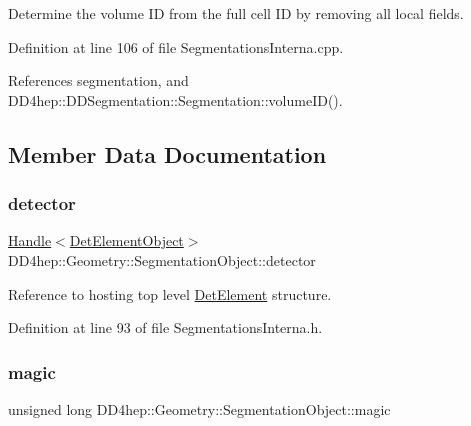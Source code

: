 Determine the volume ID from the full cell ID by removing all local fields. 



Definition at line 106 of file Segmentations\+Interna.\+cpp.



References segmentation, and D\+D4hep\+::\+D\+D\+Segmentation\+::\+Segmentation\+::volume\+I\+D().



\subsection{Member Data Documentation}
\hypertarget{class_d_d4hep_1_1_geometry_1_1_segmentation_object_aa9f9012806e2dfff465ae66650f10b94}{}\label{class_d_d4hep_1_1_geometry_1_1_segmentation_object_aa9f9012806e2dfff465ae66650f10b94} 
\subsubsection{\texorpdfstring{detector}{detector}}
{\footnotesize\ttfamily \hyperlink{class_d_d4hep_1_1_handle}{Handle}$<$\hyperlink{class_d_d4hep_1_1_geometry_1_1_det_element_object}{Det\+Element\+Object}$>$ D\+D4hep\+::\+Geometry\+::\+Segmentation\+Object\+::detector}



Reference to hosting top level \hyperlink{class_d_d4hep_1_1_geometry_1_1_det_element}{Det\+Element} structure. 



Definition at line 93 of file Segmentations\+Interna.\+h.

\hypertarget{class_d_d4hep_1_1_geometry_1_1_segmentation_object_a2fb8a80e389d915e7c74499f09fd341b}{}\label{class_d_d4hep_1_1_geometry_1_1_segmentation_object_a2fb8a80e389d915e7c74499f09fd341b} 
\subsubsection{\texorpdfstring{magic}{magic}}
{\footnotesize\ttfamily unsigned long D\+D4hep\+::\+Geometry\+::\+Segmentation\+Object\+::magic}



